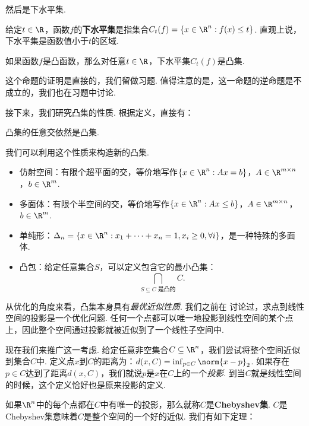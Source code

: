 然后是下水平集. 
\begin{definition}[下水平集]
    给定$t\in\R$，函数$f$的\textbf{下水平集}是指集合$C_t(f)=\{x\in\R^n:f(x)\leq t\}$. 直观上说，下水平集是函数值小于$t$的区域.
\end{definition}

\begin{proposition}\label{prop:level-set}
    如果函数$f$是凸函数，那么对任意$t\in\R$，下水平集$C_t(f)$是凸集.
\end{proposition}
这个命题的证明是直接的，我们留做习题. 值得注意的是，这一命题的逆命题是不成立的，我们也在习题中讨论. 

接下来，我们研究凸集的性质. 根据定义，直接有：

\begin{proposition}\label{prop:convex-set-intersect}
    凸集的任意交依然是凸集.
\end{proposition}
我们可以利用这个性质来构造新的凸集.
\begin{example}
\begin{itemize}
    \item 仿射空间：有限个超平面的交，等价地写作$\{x\in\R^n:Ax=b\}$，$A\in\R^{m\times n}$，$b\in\R^m$.
    \item 多面体：有限个半空间的交，等价地写作$\{x\in\R^n:Ax\leq b\}$，$A\in\R^{m\times n}$，$b\in\R^m$.
    \item 单纯形：$\Delta_n=\{x\in\R^n:x_1+\dots+x_n=1,x_i\geq 0,\forall i\}$，是一种特殊的多面体.
    \item 凸包：给定任意集合$S$，可以定义包含它的最小凸集：
    \[\bigcap_{S\subseteq C\text{ 是凸的}} C.\]
\end{itemize}
\end{example}

从优化的角度来看，凸集本身具有\emph{最优近似性质}. 我们之前在 讨论过，求点到线性空间的投影是一个优化问题. 任何一个点都可以唯一地投影到线性空间的某个点上，因此整个空间通过投影就被近似到了一个线性子空间中. 

现在我们来推广这一考虑. 给定任意非空集合$C\subseteq\R^n$，我们尝试将整个空间近似到集合$C$中. 定义点$x$到$C$的距离为：$d(x,C)=\inf_{p\in C}\norm{x-p}_2$. 如果存在$p\in C$达到了距离$d(x,C)$，我们就说$p$是$x$在$C$上的一个\emph{投影}. 到当$C$就是线性空间的时候，这个定义恰好也是原来投影的定义.

如果$\R^n$中的每个点都在$C$中有唯一的投影，那么就称$C$是\textbf{Chebyshev集}. $C$是Chebyshev集意味着$C$是整个空间的一个好的近似. 我们有如下定理：

